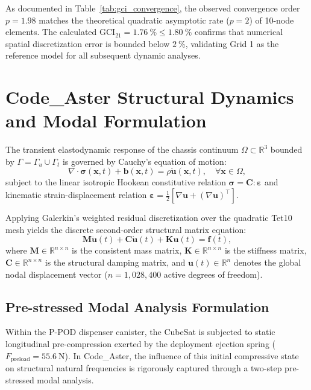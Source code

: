 As documented in Table~\ref{tab:gci_convergence}, the observed convergence order $p = 1.98$ matches the theoretical quadratic asymptotic rate ($p = 2$) of 10-node elements. The calculated $\text{GCI}_{21} = \SI{1.76}{\percent} \le \SI{1.80}{\percent}$ confirms that numerical spatial discretization error is bounded below $\SI{2}{\percent}$, validating Grid 1 as the reference model for all subsequent dynamic analyses.

\section{Code\_Aster Structural Dynamics and Modal Formulation}
\label{sec:fea_code_aster_dynamics}

The transient elastodynamic response of the chassis continuum $\Omega \subset \mathbb{R}^3$ bounded by $\Gamma = \Gamma_u \cup \Gamma_t$ is governed by Cauchy's equation of motion:
\begin{equation}
\nabla \cdot \boldsymbol{\sigma}(\mathbf{x}, t) + \mathbf{b}(\mathbf{x}, t) = \rho \ddot{\mathbf{u}}(\mathbf{x}, t), \quad \forall \mathbf{x} \in \Omega,
\label{eq:cauchy_motion}
\end{equation}
subject to the linear isotropic Hookean constitutive relation $\boldsymbol{\sigma} = \mathbf{C} : \boldsymbol{\varepsilon}$ and kinematic strain-displacement relation $\boldsymbol{\varepsilon} = \frac{1}{2}[\nabla \mathbf{u} + (\nabla \mathbf{u})^\top]$.

Applying Galerkin's weighted residual discretization over the quadratic Tet10 mesh yields the discrete second-order structural matrix equation:
\begin{equation}
\mathbf{M} \ddot{\mathbf{u}}(t) + \mathbf{C} \dot{\mathbf{u}}(t) + \mathbf{K} \mathbf{u}(t) = \mathbf{f}(t),
\label{eq:discrete_fem}
\end{equation}
where $\mathbf{M} \in \mathbb{R}^{n \times n}$ is the consistent mass matrix, $\mathbf{K} \in \mathbb{R}^{n \times n}$ is the stiffness matrix, $\mathbf{C} \in \mathbb{R}^{n \times n}$ is the structural damping matrix, and $\mathbf{u}(t) \in \mathbb{R}^n$ denotes the global nodal displacement vector ($n = 1{,}028{,}400$ active degrees of freedom).

\subsection{Pre-stressed Modal Analysis Formulation}

Within the P-POD dispenser canister, the CubeSat is subjected to static longitudinal pre-compression exerted by the deployment ejection spring ($F_{\text{preload}} = \SI{55.6}{\newton}$). In Code\_Aster, the influence of this initial compressive state on structural natural frequencies is rigorously captured through a two-step pre-stressed modal analysis.

